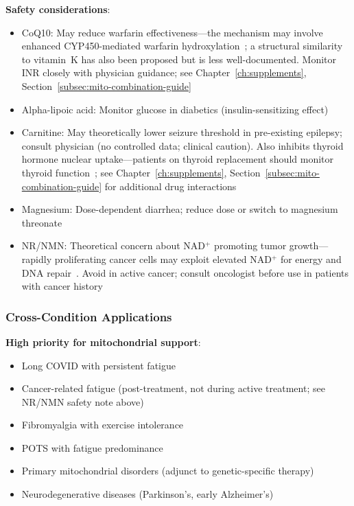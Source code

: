 \textbf{Safety considerations}:
\begin{itemize}
    \item CoQ10: May reduce warfarin effectiveness---the mechanism may involve enhanced CYP450-mediated warfarin hydroxylation~\cite{Zhou2005CoQ10Warfarin}; a structural similarity to vitamin~K has also been proposed but is less well-documented. Monitor INR closely with physician guidance; see Chapter~\ref{ch:supplements}, Section~\ref{subsec:mito-combination-guide}
    \item Alpha-lipoic acid: Monitor glucose in diabetics (insulin-sensitizing effect)
    \item Carnitine: May theoretically lower seizure threshold in pre-existing epilepsy; consult physician (no controlled data; clinical caution). Also inhibits thyroid hormone nuclear uptake---patients on thyroid replacement should monitor thyroid function~\cite{Benvenga2001CarnitineHyperthyroidism}; see Chapter~\ref{ch:supplements}, Section~\ref{subsec:mito-combination-guide} for additional drug interactions
    \item Magnesium: Dose-dependent diarrhea; reduce dose or switch to magnesium threonate
    \item NR/NMN: Theoretical concern about NAD$^+$ promoting tumor growth---rapidly proliferating cancer cells may exploit elevated NAD$^+$ for energy and DNA repair~\cite{Palmer2021NADcancer}. Avoid in active cancer; consult oncologist before use in patients with cancer history
\end{itemize}

\subsubsection{Cross-Condition Applications}

\textbf{High priority for mitochondrial support}:
\begin{itemize}
    \item Long COVID with persistent fatigue
    \item Cancer-related fatigue (post-treatment, not during active treatment; see NR/NMN safety note above)
    \item Fibromyalgia with exercise intolerance
    \item POTS with fatigue predominance
    \item Primary mitochondrial disorders (adjunct to genetic-specific therapy)
    \item Neurodegenerative diseases (Parkinson's, early Alzheimer's)
\end{itemize}

